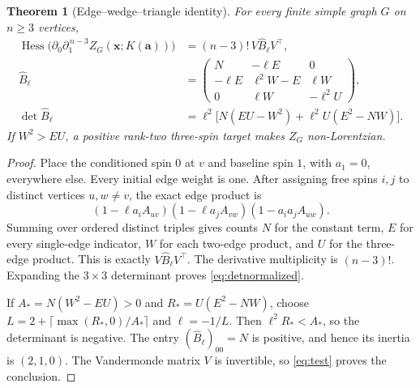 \documentclass[11pt]{article}
\newtheorem{theorem}{Theorem}
\theoremstyle{remark}
\DeclareMathOperator{\Hess}{Hess}
\newcommand{\dd}{\partial}
\begin{document}
\begin{theorem}[Edge--wedge--triangle identity]\label{thm:normalized}
For every finite simple graph $G$ on $n\geq3$ vertices,
\begin{align}
 \Hess\bigl(\dd_0\dd_1^{\,n-3}Z_G(\mathbf x;K(\mathbf a))\bigr)
    &=(n-3)!\,V\widehat{B}_\ell V^\top,                 \label{eq:normalized}\\
 \widehat{B}_\ell&=
 \begin{pmatrix}
 N&-\ell E&0\\-\ell E&\ell^2W-E&\ell W\\
 0&\ell W&-\ell^2U
 \end{pmatrix},                                       \label{eq:Bhat}\\
 \det\widehat{B}_\ell
    &=\ell^2\bigl[N(EU-W^2)+\ell^2U(E^2-NW)\bigr].    \label{eq:detnormalized}
\end{align}
If $W^2>EU$, a positive rank-two three-spin target makes $Z_G$
non-Lorentzian.
\end{theorem}
\begin{proof}
Place the conditioned spin $0$ at $v$ and baseline spin $1$, with
$a_1=0$, everywhere else. Every initial edge weight is one.
After assigning free spins $i,j$ to distinct vertices $u,w\ne v$,
the exact edge product is
\[
 (1-\ell a_i A_{uv})(1-\ell a_j A_{vw})
                         (1-a_i a_j A_{uw}).
\]
Summing over ordered distinct triples gives counts $N$ for the
constant term, $E$ for every single-edge indicator, $W$ for each
two-edge product, and $U$ for the three-edge product. This is exactly
$V\widehat{B}_\ell V^\top$. The derivative multiplicity is $(n-3)!$.
Expanding the $3\times3$ determinant proves
\eqref{eq:detnormalized}.

If $A_*=N(W^2-EU)>0$ and $R_*=U(E^2-NW)$, choose
$L=2+\lceil\max(R_*,0)/A_*\rceil$ and $\ell=-1/L$.
Then $\ell^2R_*<A_*$, so the determinant is negative.
The entry $(\widehat{B}_\ell)_{00}=N$ is positive, and hence its
inertia is $(2,1,0)$. The Vandermonde matrix $V$ is invertible,
so \eqref{eq:test} proves the conclusion.
\end{proof}
\end{document}
